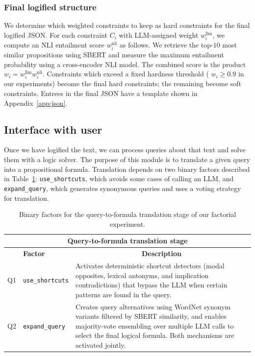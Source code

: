 \documentclass{article} %
\begin{document}
\subsubsection{Final logified structure}
We determine which weighted constraints to keep as hard constraints for the final logified JSON. For each constraint $C_i$ with LLM-assigned weight $w_i^{\text{llm}}$, we compute an NLI entailment score $w_i^{\text{nli}}$ as follows. We retrieve the top-$10$ most similar propositions using SBERT and measure the maximum entailment probability using a cross-encoder NLI model. The combined score is the product $w_i = w_i^{\text{llm}}  w_i^{\text{nli}}$. Constraints which exceed a fixed hardness threshold ( $w_i\geq 0.9$ in our experiments) become the final hard constraints; the remaining become soft constraints.  
Entrees in the final JSON have a template shown in Appendix~\ref{app:json}. 


\subsection{Interface with user}

Once we have logified the text, we can process queries about that text and solve them with a logic solver. The purpose of this module is to translate a given query into a propositional formula. Translation depends on two binary factors described in Table~\ref{table:query_factors}: \texttt{use\_shortcuts}, which avoids some cases of calling an LLM, and \texttt{expand\_query}, which generates synonymous queries and uses a voting strategy for translation.

\begin{table}[t]
\begin{center}
\begin{tabular}{c|p{3cm}|p{8cm}}
\toprule
\multicolumn{3}{c}{\bf Query-to-formula translation stage} \\
\midrule
& \bf Factor & \multicolumn{1}{c}{\bf Description} \\
\midrule
Q1 & \texttt{use\_shortcuts} & Activates deterministic shortcut detectors (modal opposites, lexical antonyms, and implication contradictions) that bypass the LLM when certain patterns are found in the query. \\ \hline
Q2 & \texttt{expand\_query} & Creates query alternatives using WordNet synonym variants filtered by SBERT similarity, and enables majority-vote ensembling over multiple LLM calls to select the final logical formula. Both mechanisms are activated jointly. \\
\bottomrule
\end{tabular}
\end{center}
\caption{Binary factors for the query-to-formula translation stage of our factorial experiment.}
\label{table:query_factors}
\end{table}
\end{document}
